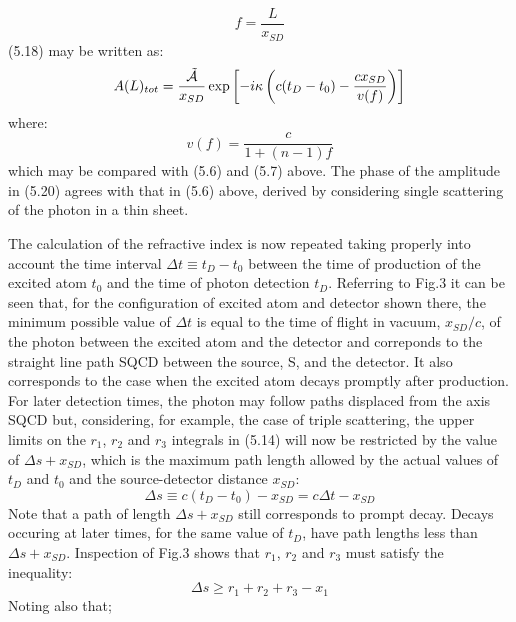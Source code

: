 {\begin{equation}
  f = \frac{L}{x_{SD}}
  \end{equation}
   (5.18) may be written as:
     \begin{equation}
   A(L)_{tot} = \frac{\tilde{{\cal A}}}{x_{SD}}
   \exp\left[ - i \kappa\left(c(t_D-t_0)-\frac{c x_{SD}}{v(f)}\right)\right]
    \end{equation}
    where:
        \begin{equation}
     v(f) = \frac{c}{1+(n-1)f}
       \end{equation}
     which may be compared with (5.6) and (5.7) above.
      The phase of the amplitude in (5.20) agrees with that in (5.6) above,
      derived by considering single scattering of the photon in a thin sheet.
     \par  The calculation of the refractive index is now repeated taking properly into 
      account the time interval $\Delta t \equiv t_D-t_0$ between the time of production 
      of the excited atom $t_0$ and the time of photon detection $t_D$. Referring 
      to Fig.3 it can be seen that, for the configuration of excited atom and detector 
      shown there, the minimum possible value of $\Delta t$ is equal to the 
      time of flight in vacuum, $x_{SD}/c$, of the photon between the excited atom and the 
      detector and correponds to the straight line path SQCD between the source, S,
     and the detector. It also corresponds to the case when the excited atom decays promptly after
      production. For later detection times, the photon may follow
       paths displaced from
      the axis SQCD but, considering, for example, the case of triple scattering,
      the upper limits on the $r_1$, $r_2$ and $r_3$ integrals in (5.14) will now be
      restricted by the value of $\Delta s+x_{SD}$, which is the maximum
      path length allowed by the actual values of $t_D$ and $t_0$ and the source-detector
      distance  $x_{SD}$:
      \begin{equation}
      \Delta s \equiv c(t_D-t_0)-x_{SD} = c\Delta t-x_{SD} 
       \end{equation}
        Note that a path of length $\Delta s+x_{SD}$ still corresponds to prompt decay. Decays
     occuring at later times, for the same value of $t_D$, have path lengths less than
      $\Delta s+x_{SD}$.
       Inspection of Fig.3 shows that $r_1$, $r_2$ and $r_3$ must satisfy the inequality:
       \begin{equation}
       \Delta s \ge r_1 +  r_2 +  r_3- x_1  
       \end{equation}
        Noting also that;
}
